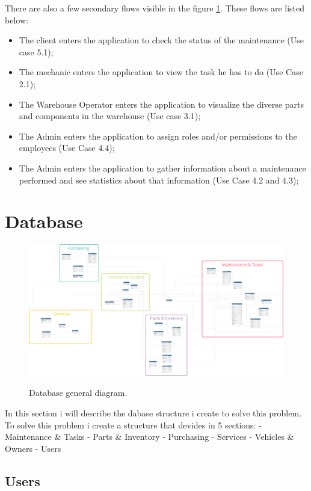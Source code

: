 There are also a few secondary flows visible in the figure \ref{fig:figure2}. 
These flows are listed below:
\begin{itemize}
  \item The client enters the application to check the status of the maintenance (Use case 5.1);
  \item The mechanic enters the application to view the task he has to do (Use Case 2.1); 
  \item The Warehouse Operator enters the application to visualize the diverse parts and components in the warehouse (Use case 3.1); 
  \item The Admin enters the application to assign roles and/or permissions to the employees (Use Case 4.4); 
  \item The Admin enters the application to gather information about a maintenance performed and see statistics about that information (Use Case 4.2 and 4.3); 
\end{itemize}
 



\section{Database} 


\begin{figure}[h]
  \caption{Database general diagram.}
  \centering
  \includegraphics[width=\textwidth]{figs/dbDiagrams/DbDiagramFull}
  \label{fig:figure2} 
\end{figure}

In this section i will describe the dabase structure i create to solve this problem.
To solve this problem i create a structure that devides in 5 sections:
- Maintenance \& Tasks
- Parts \& Inventory 
- Purchasing
- Services
- Vehicles \& Owners
- Users
 

\subsection{Users} 


